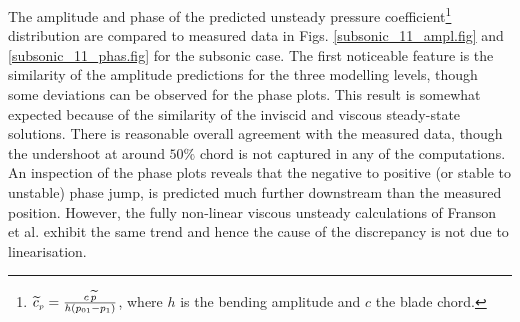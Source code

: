  The amplitude and phase of the predicted unsteady
 pressure coefficient\footnote{$\widetilde{c}_{\mbox{\tiny $p$}} =
 \frac{c\, \widetilde{p}}{h\left(p_{\mbox{\tiny $01$}} - p_{\mbox{\tiny $1$}}\right)}$, where $h$ is the
 bending amplitude and $c$ the blade chord.}
 distribution are compared to measured data in Figs.
 \ref{subsonic_11_ampl.fig} and \ref{subsonic_11_phas.fig} for the subsonic case.
 The first noticeable feature is the similarity of the amplitude predictions for the
 three modelling levels, though some deviations can be observed for the phase plots.
 This result is somewhat expected because of the similarity of the inviscid and
 viscous steady-state solutions.
 There is reasonable overall agreement with the measured data, though the undershoot
 at around $50\%$ chord is not captured in any of the computations.
 An inspection of the phase plots reveals that the negative to positive
 (or stable to unstable)  phase jump, is predicted
 much further downstream than the measured position.
 However, the fully non-linear viscous unsteady calculations of Franson et al.
 \citeyear{Bolcs:2} exhibit the same trend and hence the cause of the discrepancy
 is not due to linearisation.

